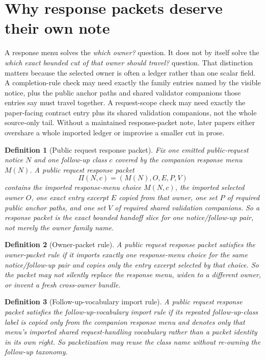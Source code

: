 \documentclass[11pt]{article}
\newtheorem{definition}{Definition}
\begin{document}
\section{Why response packets deserve their own note}
A response menu solves the \emph{which owner?} question.
It does not by itself solve the \emph{which exact bounded cut of that owner should travel?} question.
That distinction matters because the selected owner is often a ledger rather than one scalar field.
A completion-rule check may need exactly the family entries named by the visible notice, plus the public anchor paths and shared validator companions those entries say must travel together.
A request-scope check may need exactly the paper-facing contract entry plus its shared validation companions, not the whole source-only tail.
Without a maintained response-packet note, later papers either overshare a whole imported ledger or improvise a smaller cut in prose.

\begin{definition}[Public request response packet]
Fix one emitted public-request notice $N$ and one follow-up class $c$ covered by the companion response menu $M(N)$.
A \emph{public request response packet}
\[
\Pi(N,c)=(M(N),O,E,P,V)
\]
contains the imported response-menu choice $M(N,c)$, the imported selected owner $O$, one exact entry excerpt $E$ copied from that owner, one set $P$ of required public anchor paths, and one set $V$ of required shared validation companions.
So a response packet is the exact bounded handoff slice for one notice/follow-up pair, not merely the owner family name.
\end{definition}

\begin{definition}[Owner-packet rule]
A public request response packet satisfies the \emph{owner-packet rule} if it imports exactly one response-menu choice for the same notice/follow-up pair and copies only the entry excerpt selected by that choice.
So the packet may not silently replace the response menu, widen to a different owner, or invent a fresh cross-owner bundle.
\end{definition}

\begin{definition}[Follow-up-vocabulary import rule]
A public request response packet satisfies the \emph{follow-up-vocabulary import rule} if its repeated follow-up-class label is copied only from the companion response menu and denotes only that menu's imported shared request-handling vocabulary rather than a packet identity in its own right.
So packetization may reuse the class name without re-owning the follow-up taxonomy.
\end{definition}
\end{document}
